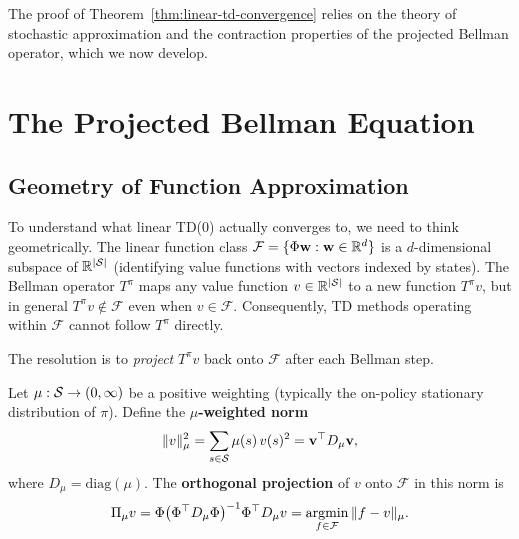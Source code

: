 The proof of Theorem~\ref{thm:linear-td-convergence} relies on the theory of stochastic
approximation and the contraction properties of the projected Bellman operator, which we now
develop.

\section{The Projected Bellman Equation}
\label{sec:projected-bellman}

\subsection{Geometry of Function Approximation}

To understand what linear TD(0) actually converges to, we need to think geometrically.  The linear
function class $\mathcal{F} = \{\Phi \mathbf{w} : \mathbf{w} \in \mathbb{R}^d\}$ is a $d$-dimensional
subspace of $\mathbb{R}^{|\mathcal{S}|}$ (identifying value functions with vectors indexed by states).  The
Bellman operator $T^\pi$ maps any value function $v \in \mathbb{R}^{|\mathcal{S}|}$ to a new function
$T^\pi v$, but in general $T^\pi v \notin \mathcal{F}$ even when $v \in \mathcal{F}$.
Consequently, TD methods operating within $\mathcal{F}$ cannot follow $T^\pi$ directly.

The resolution is to \emph{project} $T^\pi v$ back onto $\mathcal{F}$ after each Bellman step.

\begin{definition}
\label{def:mu-projection}
Let $\mu : \mathcal{S} \to (0, \infty)$ be a positive weighting (typically the on-policy stationary
distribution of $\pi$).  Define the \textbf{$\mu$-weighted norm}
\begin{equation}
\label{eq:mu-norm}
\|v\|_\mu^2 = \sum_{s \in \mathcal{S}} \mu(s)\, v(s)^2 = \mathbf{v}^\top D_\mu \mathbf{v},
\end{equation}
where $D_\mu = \mathrm{diag}(\mu)$.  The \textbf{orthogonal projection} of $v$ onto
$\mathcal{F}$ in this norm is
\begin{equation}
\label{eq:projection-def}
\Pi_\mu v = \Phi\bigl(\Phi^\top D_\mu \Phi\bigr)^{-1} \Phi^\top D_\mu v
= \operatorname*{argmin}_{f \in \mathcal{F}} \|f - v\|_\mu.
\end{equation}
\end{definition}

